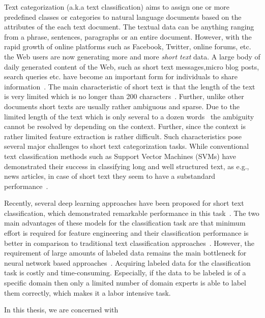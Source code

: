 Text categorization (a.k.a text classification) aims to assign one or more predefined classes or categories to natural language documents based on the attributes of the each text document. The textual data can be anything ranging from a phrase, sentences, paragraphs or an entire document. %
However, with the rapid growth of online platforms such as Facebook, Twitter, online forums, etc. the Web users are now generating more and more \textit{short text} data. A large body of daily generated content of the Web, such as short text messages,micro blog posts, search queries etc. have become an important form for individuals to share information~\cite{STTopicMemory}. The main characteristic of short text is that the length of the text is very limited which is no longer than 200 characters~\cite{song2014short}. Further, unlike other documents short texts are usually rather ambiguous and sparse. Due to the limited length of the text which is only several to a dozen words~\cite{song2014short} the ambiguity cannot be resolved by depending on the context. Further, since the context is rather limited feature extraction is rather difficult. Such characteristics pose several major challenges to short text categorization tasks. While conventional text classification methods such as Support Vector Machines (SVMs) have demonstrated their success in classifying long and well structured text, as e.g., news articles, in case of short text they seem to have a substandard performance~\cite{STTopicMemory}.


\par Recently, several deep learning approaches have been proposed for short text classification, which demonstrated remarkable performance in this task~\cite{sentiment/aaai/MaPC18,DBLP:conf/emnlp/ChenSBY17}. The two main advantages of these models for the classification task are that minimum effort is required for feature engineering and their classification performance is better in comparison to traditional text classification approaches~\cite{WeaklySupervised}. However, the requirement of large amounts of labeled data remains the main bottleneck for neural network based approaches~\cite{WeaklySupervised}. Acquiring labeled data for the classification task is costly and time-consuming. Especially, if the data to be labeled is of a specific domain then only a limited number of domain experts is able to label them correctly, which makes it a labor intensive task.

In this thesis, we are concerned with





